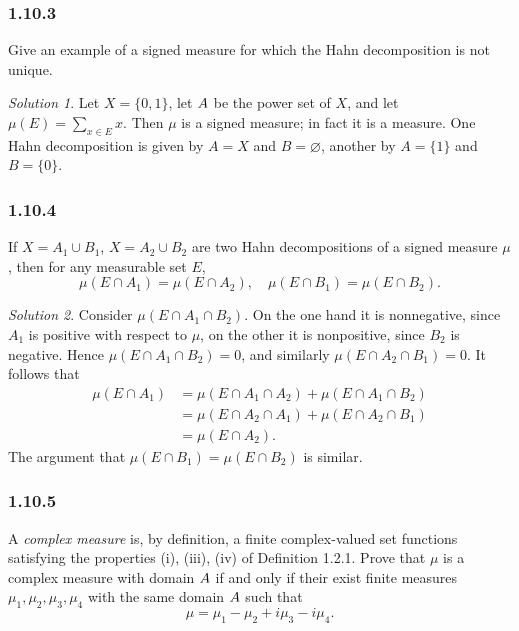 \documentclass{report}
\let\cal\relax
\newcommand{\cal}[1]{\mathcal{#1}}
\theoremstyle{remark}
\newtheorem*{solution}{Solution}
\begin{document}
\subsubsection*{1.10.3}
Give an example of a signed measure for which the Hahn decomposition is not unique.

\begin{solution}
  Let $X = \{0,1\}$, let $\cal A$ be the power set of $X$, and let $\mu(E) = \sum_{x \in E} x$. Then $\mu$ is a signed measure; in fact it is a measure. One Hahn decomposition is given by $A = X$ and $B = \varnothing$, another by $A = \{1\}$ and $B = \{0\}$.
\end{solution}

\subsubsection*{1.10.4}
If $X = A_1 \cup B_1$, $X = A_2 \cup B_2$ are two Hahn decompositions of a signed measure $\mu$, then for any measurable set $E$,
\begin{equation*}
  \mu(E \cap A_1) = \mu(E \cap A_2), \quad \mu(E \cap B_1) = \mu(E \cap B_2).
\end{equation*}

\begin{solution}
  Consider $\mu(E \cap A_1 \cap B_2)$. On the one hand it is nonnegative, since $A_1$ is positive with respect to $\mu$, on the other it is nonpositive, since $B_2$ is negative. Hence $\mu(E \cap A_1 \cap B_2) = 0$, and similarly $\mu(E \cap A_2 \cap B_1) = 0$. It follows that
  \begin{equation*}
    \begin{split}
      \mu(E \cap A_1) &= \mu(E \cap A_1 \cap A_2) + \mu(E \cap A_1 \cap B_2) \\
      &= \mu(E \cap A_2 \cap A_1) + \mu(E \cap A_2 \cap B_1) \\
      &= \mu(E \cap A_2).
    \end{split}
  \end{equation*}
  The argument that $\mu(E \cap B_1) = \mu(E \cap B_2)$ is similar.
\end{solution}

\subsubsection*{1.10.5}
A \emph{complex measure} is, by definition, a finite complex-valued set functions satisfying the properties (i), (iii), (iv) of Definition 1.2.1. Prove that $\mu$ is a complex measure with domain $\cal A$ if and only if their exist finite measures $\mu_1, \mu_2, \mu_3, \mu_4$ with the same domain $\cal A$ such that
\begin{equation*}
  \mu = \mu_1 - \mu_2 + i \mu_3 - i \mu_4.
\end{equation*}
\end{document}
